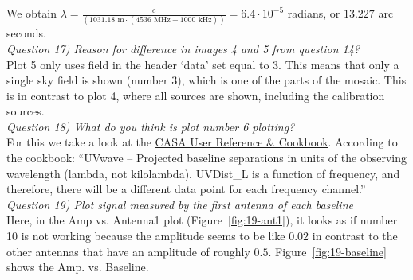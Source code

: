 \documentclass[12pt, a4paper]{article}
\begin{document}
We obtain $\lambda = \frac{c}{(1031.18 \text{ m}\cdot(4536 \text{ MHz} + 1000 \text{ kHz}))} = 6.4 \cdot 10^{-5}$ radians, or $13.227$ arc seconds. \\

\noindent \textit{Question 17) Reason for difference in images 4 and 5 from question 14?} \\
Plot 5 only uses field in the header `data' set equal to 3. This means that only a single sky field is shown (number 3), which is one of the parts of the mosaic. This is in contrast to plot 4, where all sources are shown, including the calibration sources. \\

\noindent \textit{Question 18) What do you think is plot number 6 plotting?} \\
For this we take a look at the \href{http://casa.nrao.edu/Doc/Cookbook/casa_cookbook.pdf}{CASA User Reference \& Cookbook}. According to the cookbook: ``UVwave -- Projected baseline separations in units of the observing wavelength (lambda, not kilolambda). UVDist\_L is a function of frequency, and therefore, there will be a different data point for each frequency channel.'' \\

\noindent \textit{Question 19) Plot signal measured by the first antenna of each baseline} \\
Here, in the Amp vs. Antenna1 plot (Figure~\ref{fig:19-ant1}), it looks as if number 10 is not working because the amplitude seems to be like $0.02$ in contrast to the other antennas that have an amplitude of roughly $0.5$. Figure~\ref{fig:19-baseline} shows the Amp. vs. Baseline. \\
\end{document}
